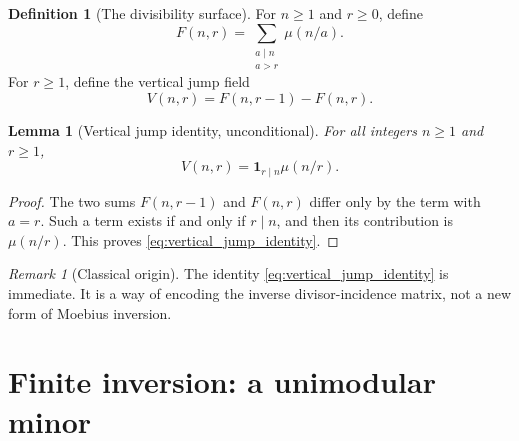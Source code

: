 \documentclass[11pt]{amsart}
\numberwithin{equation}{section}
\theoremstyle{plain}
\newtheorem{lemma}[theorem]{Lemma}
\theoremstyle{definition}
\newtheorem{definition}[theorem]{Definition}
\theoremstyle{remark}
\newtheorem{remark}[theorem]{Remark}
\newcommand{\one}{\mathbf 1}
\newcommand{\mob}{\mu}
\newcommand{\Fsurf}{F}
\newcommand{\Vjump}{V}
\begin{document}
\begin{definition}[The divisibility surface]
\label{def:F_surface}
For \(n\ge1\) and \(r\ge0\), define
\begin{equation}
\Fsurf(n,r)=\sum_{\substack{a\mid n\\ a>r}}\mob(n/a).
\label{eq:F_def}
\end{equation}
For \(r\ge1\), define the vertical jump field
\begin{equation}
\Vjump(n,r)=\Fsurf(n,r-1)-\Fsurf(n,r).
\label{eq:V_def}
\end{equation}
\end{definition}

\begin{lemma}[Vertical jump identity, unconditional]
\label{lem:vertical_jump}
For all integers \(n\ge1\) and \(r\ge1\),
\begin{equation}
\Vjump(n,r)=\one_{r\mid n}\mob(n/r).
\label{eq:vertical_jump_identity}
\end{equation}
\end{lemma}

\begin{proof}
The two sums \(\Fsurf(n,r-1)\) and \(\Fsurf(n,r)\) differ only by the term with \(a=r\).  Such a term exists if and only if \(r\mid n\), and then its contribution is \(\mob(n/r)\).  This proves \eqref{eq:vertical_jump_identity}.
\end{proof}

\begin{remark}[Classical origin]
\label{rem:jump_origin}
The identity \eqref{eq:vertical_jump_identity} is immediate.  It is a way of encoding the inverse divisor-incidence matrix, not a new form of Moebius inversion.
\end{remark}

\section{Finite inversion: a unimodular minor}
\label{sec:finite_inverse}
\end{document}
